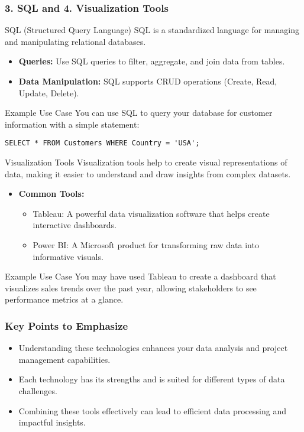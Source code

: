 \documentclass{beamer}
\begin{document}
\begin{frame}[fragile]
    \frametitle{3. SQL and 4. Visualization Tools}
    \begin{block}{SQL (Structured Query Language)}
        SQL is a standardized language for managing and manipulating relational databases.
    \end{block}
    \begin{itemize}
        \item \textbf{Queries:} Use SQL queries to filter, aggregate, and join data from tables.
        \item \textbf{Data Manipulation:} SQL supports CRUD operations (Create, Read, Update, Delete).
    \end{itemize}
    \begin{block}{Example Use Case}
        You can use SQL to query your database for customer information with a simple statement:
        \begin{lstlisting}
SELECT * FROM Customers WHERE Country = 'USA';
        \end{lstlisting}
    \end{block}
    
    \begin{block}{Visualization Tools}
        Visualization tools help to create visual representations of data, making it easier to understand and draw insights from complex datasets.
    \end{block}
    \begin{itemize}
        \item \textbf{Common Tools:}
            \begin{itemize}
                \item Tableau: A powerful data visualization software that helps create interactive dashboards.
                \item Power BI: A Microsoft product for transforming raw data into informative visuals.
            \end{itemize}
    \end{itemize}
    \begin{block}{Example Use Case}
        You may have used Tableau to create a dashboard that visualizes sales trends over the past year, allowing stakeholders to see performance metrics at a glance.
    \end{block}
\end{frame}

\begin{frame}[fragile]
    \frametitle{Key Points to Emphasize}
    \begin{itemize}
        \item Understanding these technologies enhances your data analysis and project management capabilities.
        \item Each technology has its strengths and is suited for different types of data challenges.
        \item Combining these tools effectively can lead to efficient data processing and impactful insights.
    \end{itemize}
\end{frame}
\end{document}

